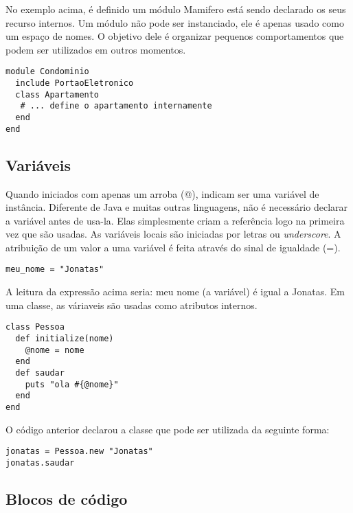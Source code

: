 \documentclass[espaco=simples,appendix=Name]{abnt}
\begin{document}
No exemplo acima, é definido um módulo Mamifero está sendo declarado os seus recurso internos. Um módulo não pode ser instanciado, ele é apenas usado como um espaço de nomes. O objetivo dele é organizar pequenos comportamentos que podem ser utilizados em outros momentos.

\begin{lstlisting}[caption=Exemplo de módulo como espaço ]
module Condominio
  include PortaoEletronico
  class Apartamento
   # ... define o apartamento internamente
  end
end 
\end{lstlisting}

\subsection{ Variáveis } 

Quando iniciados com apenas um arroba (@), indicam ser uma variável de instância. Diferente de Java e muitas outras linguagens, não é necessário declarar a variável antes de usa-la. Elas simplesmente criam a referência logo na primeira vez que são usadas.
As variáveis locais são iniciadas por letras ou \textit{underscore}.
A atribuição de um valor a uma variável é feita através do sinal de igualdade (=).

\begin{lstlisting}[caption=Exemplo de variável local ]
meu_nome = "Jonatas"
\end{lstlisting}

A leitura da expressão acima seria: meu nome (a variável) é igual a Jonatas.
Em uma classe, as váriaveis são usadas como atributos internos.

\begin{lstlisting}[caption=Exemplo de variável de instância em uma classe ]
class Pessoa
  def initialize(nome)
    @nome = nome
  end
  def saudar
    puts "ola #{@nome}"
  end
end
\end{lstlisting}

O código anterior declarou a classe que pode ser utilizada da seguinte forma:

\begin{lstlisting}[caption=Exemplo de utilização da classe descrita acima ]
jonatas = Pessoa.new "Jonatas"
jonatas.saudar 
\end{lstlisting}

\subsection { Blocos de código }
\end{document}

